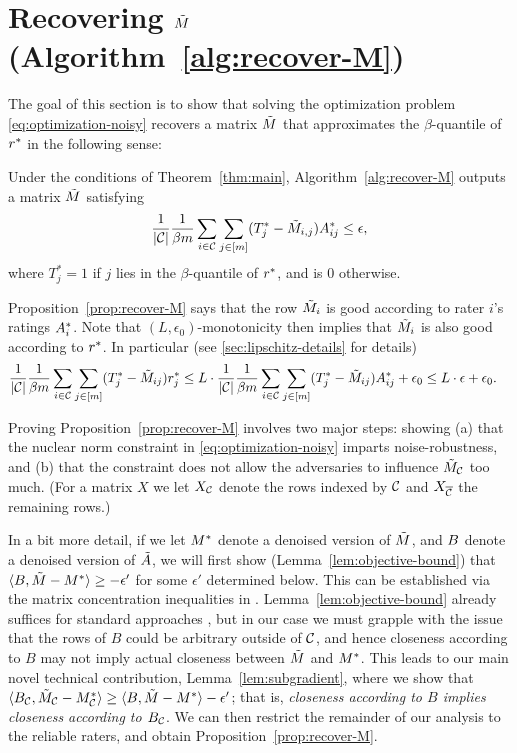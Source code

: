 \section{Recovering $\tilde{M}$ (Algorithm~\ref{alg:recover-M})}
\label{sec:approach-M}

The goal of this section is to show that solving the optimization 
problem \eqref{eq:optimization-noisy} recovers a matrix $\tilde{M}$ that 
approximates the $\beta$-quantile of $r^*$ in the following sense:
\begin{proposition}
\label{prop:recover-M}
Under the conditions of Theorem~\ref{thm:main}, Algorithm~\ref{alg:recover-M} 
outputs a matrix $\tilde{M}$ satisfying 
\[ \frac{1}{|\mathcal{C}|} \frac{1}{\beta m} \sum_{i \in \mathcal{C}} \sum_{j \in [m]} (T^*_j - \tilde{M}_{i,j})A^*_{ij} \leq \epsilon, \]
where $T^*_j = 1$ if $j$ lies in the $\beta$-quantile of $r^*$, and is $0$ otherwise.
\end{proposition}
Proposition~\ref{prop:recover-M} says that the row $\tilde{M}_i$ 
is good according to rater $i$'s ratings $A^*_i$. Note that
$(L,\epsilon_0)$-monotonicity 
then implies that $\tilde{M}_i$ is also good according to $r^*$.
In particular (see \ref{sec:lipschitz-details} for details)
\begin{align}
\label{eq:lipschitz-usage}
\frac{1}{|\mathcal{C}|}\frac{1}{\beta m}\sum_{i \in \mathcal{C}}\sum_{j \in [m]} (T_j^*-\tilde{M}_{ij})r^*_j
&\leq L \cdot \frac{1}{|\mathcal{C}|}\frac{1}{\beta m}\sum_{i \in \mathcal{C}}\sum_{j \in [m]} (T_j^*-\tilde{M}_{ij})A^*_{ij} + \epsilon_0 
\leq L \cdot \epsilon + \epsilon_0.
\end{align}

Proving Proposition~\ref{prop:recover-M} involves two major steps: showing 
(a) that the nuclear norm constraint in \eqref{eq:optimization-noisy} 
imparts noise-robustness, and (b) that the constraint does not allow 
the adversaries to influence $\tilde{M}_{\mathcal{C}}$ too much. (For a matrix $X$ 
we let $X_{\mathcal{C}}$ denote the rows indexed by $\mathcal{C}$ and $X_{\overline{\mathcal{C}}}$ the remaining rows.)

In a bit 
more detail, if we let $M^*$ denote a denoised version of $\tilde{M}$, and $B$ 
denote a denoised version of $\tilde{A}$, we will first show 
(Lemma~\ref{lem:objective-bound}) that 
$\langle B, \tilde{M} - M^* \rangle \geq -\epsilon'$ for some $\epsilon'$ 
determined below. This can be established via the matrix concentration 
inequalities in . Lemma~\ref{lem:objective-bound} already 
suffices for standard approaches , 
but in our case we must grapple with the issue that the rows of $B$ could be 
arbitrary outside of $\mathcal{C}$, and hence closeness according to $B$ may not 
imply actual closeness between $\tilde{M}$ and $M^*$. This leads to our main 
novel technical contribution, Lemma~\ref{lem:subgradient}, where we show 
that $\langle B_{\mathcal{C}}, \tilde{M}_{\mathcal{C}} - M^*_{\mathcal{C}} \rangle \geq \langle B, \tilde{M} - M^* \rangle - \epsilon'$; 
that is, \emph{closeness according to $B$ implies closeness according to 
$B_{\mathcal{C}}$}. We can then restrict the remainder of our analysis to the 
reliable raters, and obtain Proposition~\ref{prop:recover-M}.

